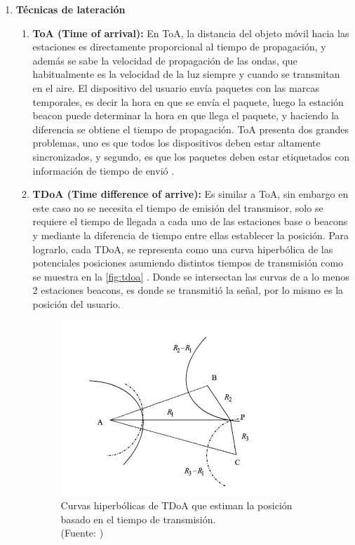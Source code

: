 \begin{enumerate}
\item \textbf{Técnicas de lateración }
\begin{enumerate}
\item \textbf{ToA (Time of arrival):} En ToA, la distancia del objeto móvil hacia las estaciones es directamente proporcional al tiempo de propagación, y además se sabe la velocidad de propagación de las ondas, que habitualmente es la velocidad de la luz siempre y cuando se transmitan en el aire. El dispositivo del usuario envía paquetes con las marcas temporales, es decir la hora en que se envía el paquete, luego la estación beacon puede determinar la hora en que llega el paquete, y haciendo la diferencia se obtiene el tiempo de propagación. ToA presenta dos grandes problemas, uno es que todos los dispositivos deben estar altamente sincronizados, y segundo, es que los paquetes deben estar etiquetados con información de tiempo de envió \citep{102710}.

\item \textbf{TDoA (Time difference of arrive):} Es similar a ToA, sin embargo en este caso no se necesita el tiempo de emisión del transmisor, solo se requiere el tiempo de llegada a cada uno de las estaciones base o beacons y mediante la diferencia de tiempo entre ellas establecer la posición. Para lograrlo, cada TDoA, se representa como una curva hiperbólica de las potenciales posiciones asumiendo distintos tiempos de transmisión como se muestra en la \autoref{fig:tdoa} . Donde se intersectan las curvas de a lo menos 2 estaciones beacons, es donde se transmitió la señal, por lo mismo es la posición del usuario.

\begin{figure}[ht!]
\centering
\includegraphics[width=.4\textwidth]{figures/tdoa.png}
\caption[abs]{Curvas hiperbólicas de TDoA que estiman la posición basado en el tiempo de transmisión.\\
{\scriptsize (Fuente: \citep{Liu:2007:SWI:2220431.2221077})}}
\label{fig:tdoa}
\end{figure}


\end{enumerate}
\end{enumerate}
